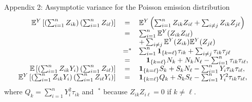 \documentclass[compress,10pt]{beamer}
\begin{document}
\begin{frame}[allowframebreaks]{Appendix 2: Assymptotic variance for the Poisson emission distribution}
$$
\begin{array}{rcl}
 \mathbb{E}^Y\left[\left(\sum_{i=1}^n Z_{ik} \right) \left(\sum_{i=1}^n Z_{i\ell} \right) \right] &=&  
 \mathbb{E}^Y\left(\sum_{i=1}^n Z_{ik} Z_ {i\ell}  + \sum_{i \neq j} Z_{ik} Z_ {j\ell} \right) \\
  &=&  \sum_{i=1}^n \mathbb{E}^Y(Z_{ik} Z_ {i\ell})\\
  && + \sum_{i \neq j} \mathbb{E}^Y(Z_{ik}) \mathbb{E}^Y(Z_{j\ell}) \\ 
 &=^*&  \sum_{i=1}^n  \mathbf{1}_{\{k=\ell\}}  \tau_{ik} + \sum_{i \neq j} \tau_{ik} \tau_{j\ell} \quad \\
 &=& \quad \mathbf{1}_{\{k=\ell\}}  N_k+ N_k N_\ell - \sum_{i=1}^n \tau_{ik} \tau_{i\ell}, \\
  \mathbb{E}\left[\left(\sum_{i=1}^n Z_{ik} Y_i \right) \left(\sum_{i=1}^n Z_{i\ell} \right) \right] 
  &=&  \mathbf{1}_{\{k=\ell\}}  S_k + S_k N_\ell - \sum_{i=1}^n Y_i \tau_{ik} \tau_{i\ell}, \\
 \mathbb{E}^Y\left[\left(\sum_{i=1}^n Z_{ik} Y_i \right) \left(\sum_{i=1}^n Z_{i\ell} Y_i \right) \right] 
   &=&  \mathbf{1}_{\{k=\ell\}}  Q_k + S_k S_\ell - \sum_{i=1}^n Y_i^2 \tau_{ik} \tau_{i\ell}, \\
\end{array}
$$
where $Q_k = \sum_{i=1}^n Y_i^2 \tau_{ik}$ and  $\;^*$ because  $Z_{ik} Z_{i\ell} = 0$ if $k \neq \ell$.

\hyperlink{Prop:Louis}{}

\end{frame}
\end{document}

